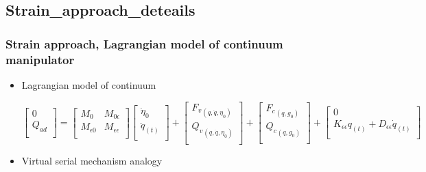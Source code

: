 \documentclass[compress]{thesisbeamer}
\begin{document}
		\subsection{Strain_approach_deteails}
        \begin{frame}
        	\frametitle{Strain approach, Lagrangian model of continuum manipulator}
			\begin{itemize}%
  				\item Lagrangian model of continuum
  				\begin{fleqn}
  				\begin{equation}
  					\begin{bmatrix}
  							0 		\\
  						{Q}_{ad}	\\
					\end{bmatrix} 
					= 
					\begin{bmatrix}
						{M}_{0}		& {M}_{0\epsilon} 				\\ 
						{M}_{\epsilon0}	& {M}_{\epsilon\epsilon}	\\
					\end{bmatrix}
					\begin{bmatrix}
						{\dot{\eta}}_{0} 	\\ 
						{\ddot{q}}_{(t)}	\\
					\end{bmatrix}	
					+
					\begin{bmatrix}
						{{F}_{v}}_{\left(q , \dot{q} , {\eta}_{0} \right)}	\\
						{{Q}_{v}}_{\left(q , \dot{q} , {\eta}_{0} \right)}	\\
					\end{bmatrix}
					+
					\begin{bmatrix}
						{{F}_{c}}_{\left(q , {g}_{0} \right)}	\\ 
						{{Q}_{c}}_{\left(q , {g}_{0} \right)}	\\
					\end{bmatrix}
					+
					\begin{bmatrix}
						0 \\
						{K}_{\epsilon\epsilon} {q}_{\left(t \right)} + {D}_{\epsilon\epsilon} {\dot{q}}_{\left(t \right)}	\\
					\end{bmatrix}
  				\end{equation} 
  				\end{fleqn}
  				\item Virtual serial mechanism analogy			
  				\begin{itemize}

\end{itemize}
\end{itemize}
\end{frame}
\end{document}
